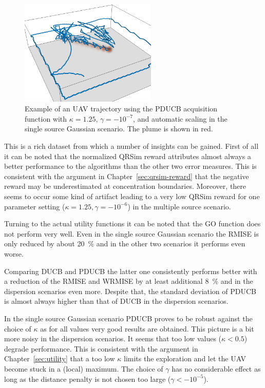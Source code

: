 \begin{figure}
    \centering
    \includegraphics[width=6.5cm]{plots/trajectory}
    \caption[Example of an UAV trajectory]{Example of an UAV trajectory using 
        the PDUCB acquisition function with $\kappa = 1.25$, $\gamma 
        = -10^{-7}$, and automatic scaling in the single source Gaussian 
        scenario. The plume is shown in red.}\label{fig:trajectory}
\end{figure}

This is a rich dataset from which a number of insights can be gained. First of 
all it can be noted that the normalized QRSim reward attributes almost always 
a better performance to the algorithms than the other two error measures.  This 
is consistent with the argument in Chapter~\ref{sec:qrsim-reward} that the 
negative reward may be underestimated at concentration boundaries. Moreover, 
there seems to occur some kind of artifact leading to a very low QRSim reward 
for one parameter setting ($\kappa = 1.25, \gamma = -10^{-6}$) in the multiple 
source scenario.

Turning to the actual utility functions it can be noted that the GO function 
does not perform very well.  Even in the single source Gaussian scenario the 
RMISE is only reduced by about \SI{20}{\percent} and in the other two scenarios 
it performs even worse.

Comparing DUCB and PDUCB the latter one consistently performs better with 
a reduction of the RMISE and WRMISE by at least additional \SI{8}{\percent} and 
in the dispersion scenarios even more.  Despite that, the standard deviation of 
PDUCB is almost always higher than that of DUCB in the dispersion scenarios.

In the single source Gaussian scenario PDUCB proves to be robust against the 
choice of $\kappa$ as for all values very good results are obtained. This 
picture is a bit more noisy in the dispersion scenarios. It seems that too low 
values ($\kappa < 0.5$) degrade performance. This is consistent with the 
argument in Chapter~\ref{sec:utility} that a too low $\kappa$ limits the 
exploration and let the UAV become stuck in a (local) maximum. The choice of 
$\gamma$ has no considerable effect as long as the distance penalty is not 
chosen too large ($\gamma < -10^{-5}$).

